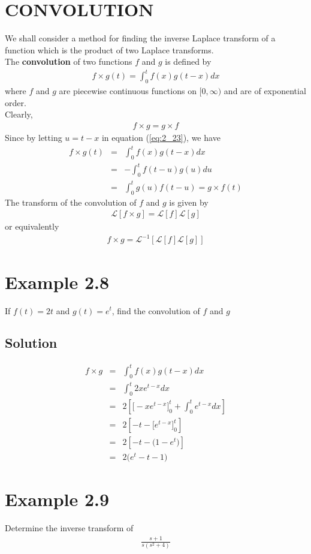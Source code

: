 \documentclass[11pt]{report}
\newcommand{\Laplace}{\mathcal{L}}
\newcommand{\ft}{f(t)}
\newcommand{\sbracket}[1]{\left[#1\right]}
\newcommand{\LFn}[1]{\Laplace \sbracket{#1}}
\newcommand{\InverseL}[1]{\Laplace^{-1}\left[#1\right]}
\newcommand{\sps}{\\[0.2cm]}
\newcommand{\refn}[1]{(\ref{#1})}
\newcommand{\refx}[1]{\refn{eq:#1}}
\newcommand{\bt}[1]{\textbf{#1}}
\begin{document}
	\section{CONVOLUTION}
	We shall consider a method for finding the inverse Laplace transform of a function which is the product of two Laplace transforms.\sps
	The \bt{convolution} of two functions $f$ and $g$ is defined by 
	\begin{eqnarray}
		f\times g(t) = \int_0^tf(x)g(t-x)dx\label{eq:2_23}
	\end{eqnarray}
	where $f$ and $g$ are piecewise continuous functions on $[0,\infty)$ and are of exponential order.\sps
	Clearly,
	\begin{eqnarray*}
		f\times g = g\times f
	\end{eqnarray*}
	Since by letting $u=t-x$ in equation \refx{2_23}, we have
	\begin{eqnarray*}
		f\times g(t) &=&\int_0^tf(x)g(t-x)dx\sps
		&=&-\int_0^t f(t-u)g(u)du\sps
		&=&\int_0^t g(u)f(t-u) = g\times f(t)
	\end{eqnarray*}
	The transform of the convolution of $f$ and $g$ is given by
	\begin{eqnarray}
		\LFn{f\times g} = \LFn{f}\LFn{g}\label{eq:2_24}
	\end{eqnarray}
	or equivalently
	\begin{eqnarray}
		f\times g = \InverseL{\LFn{f}\LFn{g}}\label{eq:2_25}
	\end{eqnarray}

	\section*{Example 2.8}
	If $\ft=2t$ and $g(t)=e^t$, find the convolution of $f$ and $g$\sps
	\subsection*{Solution}
	\begin{eqnarray*}
		f\times g &=&\int_0^t f(x)g(t-x)dx\sps
		&=&\int_0^t 2xe^{t-x}dx\sps
		&=& 2\left[\Big[-xe^{t-x}\Big]_0^t + \int_0^te^{t-x}dx\right]\sps
		&=&2\left[-t - \Big[e^{t-x}\Big]_0^t\right]\sps
		&=&2\left[-t - \Big(1-e^t\Big)\right]\sps
		&=&2\Big(e^t-t-1\Big)
	\end{eqnarray*}

	\section*{Example 2.9}
	Determine the inverse transform of
	\begin{eqnarray*}
		\frac{s+1}{s(s^2+4)}
	\end{eqnarray*}
\end{document}
